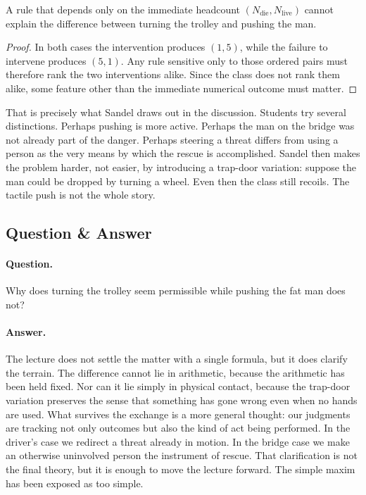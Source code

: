 \begin{proposition}
A rule that depends only on the immediate headcount \((N_{\text{die}},N_{\text{live}})\) cannot explain the difference between turning the trolley and pushing the man.
\end{proposition}

\begin{proof}
In both cases the intervention produces \((1,5)\), while the failure to intervene produces \((5,1)\). Any rule sensitive only to those ordered pairs must therefore rank the two interventions alike. Since the class does not rank them alike, some feature other than the immediate numerical outcome must matter.
\end{proof}

That is precisely what Sandel draws out in the discussion. Students try several distinctions. Perhaps pushing is more active. Perhaps the man on the bridge was not already part of the danger. Perhaps steering a threat differs from using a person as the very means by which the rescue is accomplished. Sandel then makes the problem harder, not easier, by introducing a trap-door variation: suppose the man could be dropped by turning a wheel. Even then the class still recoils. The tactile push is not the whole story.

\subsection{Question \& Answer}

\paragraph{Question.} Why does turning the trolley seem permissible while pushing the fat man does not?

\paragraph{Answer.} The lecture does not settle the matter with a single formula, but it does clarify the terrain. The difference cannot lie in arithmetic, because the arithmetic has been held fixed. Nor can it lie simply in physical contact, because the trap-door variation preserves the sense that something has gone wrong even when no hands are used. What survives the exchange is a more general thought: our judgments are tracking not only outcomes but also the kind of act being performed. In the driver's case we redirect a threat already in motion. In the bridge case we make an otherwise uninvolved person the instrument of rescue. That clarification is not the final theory, but it is enough to move the lecture forward. The simple maxim has been exposed as too simple.


